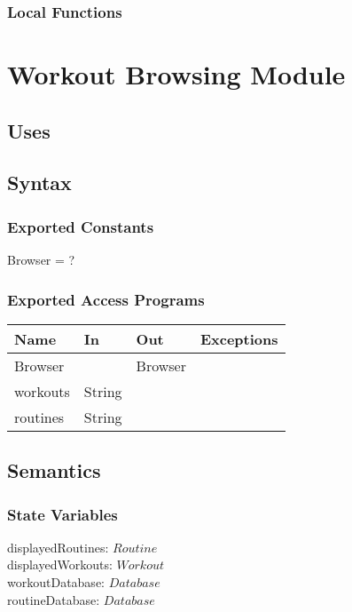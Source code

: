 \documentclass[12pt, titlepage]{article}
\begin{document}
\subsubsection{Local Functions}


\newpage

\section{Workout Browsing Module}

\subsection{Uses}

\subsection{Syntax}

\subsubsection{Exported Constants}
Browser = ?
\subsubsection{Exported Access Programs}

\begin{center}
	\begin{tabular}{p{2cm} p{4cm} p{4cm} p{2cm}}
		\hline
		\textbf{Name} & \textbf{In} & \textbf{Out} & \textbf{Exceptions} \\
		\hline
		Browser &  & Browser &  \\
		workouts & String &  &  \\
		routines & String &  &  \\
		\hline
	\end{tabular}
\end{center}

\subsection{Semantics}

\subsubsection{State Variables}

displayedRoutines: $Routine$ \\
displayedWorkouts: $Workout$ \\
workoutDatabase: $Database$ \\
routineDatabase: $Database$ \\
\end{document}
